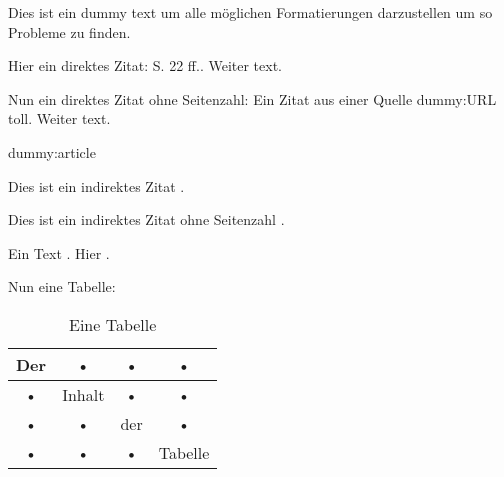 %
%
%
%


Dies ist ein dummy text um alle möglichen Formatierungen darzustellen um so 
Probleme zu finden.

\bigskip
Hier ein direktes Zitat: 
{S. 22 ff.}. Weiter text.

\smallskip
Nun ein direktes Zitat ohne Seitenzahl:
\QuoteDirectNoPage
{Ein Zitat \ElisionSmall{} aus einer Quelle }{dummy:URL}
toll. Weiter text.

\smallskip
{}
{dummy:article}

\smallskip
Dies ist ein indirektes Zitat .

\smallskip
Dies ist ein indirektes Zitat ohne Seitenzahl .

\smallskip
Ein Text .
Hier .

\bigskip
Nun eine Tabelle: 

\begin{table}[htb]
	\centering
	\begin{tabular}{|c|c|c|c|}
		\hline 
		Der & • & • & • \\ 
		\hline \Grayrow
		• & Inhalt & • & • \\ 
		\hline 
		• & • & der & • \\ 
		\hline \Grayrow
		• & • & • & Tabelle \\ 
		\hline 
	\end{tabular}
	\caption{Eine Tabelle}
	\label{tab:testtab}
\end{table}

